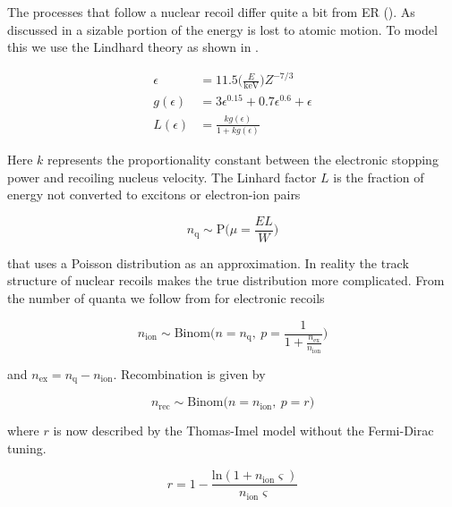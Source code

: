 The processes that follow a nuclear recoil differ quite a bit from ER ().  As
discussed in  a sizable portion of the energy is lost to atomic motion.  To model this we use the Lindhard theory
as shown in .

\begin{equation}
\begin{aligned}
\epsilon &= 11.5 \bigg( \frac{E}{\mathrm{keV}} \bigg) Z^{-7/3} \\
g( \epsilon ) &= 3 \epsilon ^{0.15} + 0.7 \epsilon ^{0.6} + \epsilon \\
L( \epsilon ) &= \frac{k g( \epsilon ) }{1 + k g( \epsilon )}
\label{eq:er_nr_calibrations_parameter_determ_nr_lindhard}
\end{aligned}
\end{equation}

Here $k$ represents the proportionality constant between the electronic stopping power and recoiling nucleus velocity.  The Linhard factor
$L$ is the fraction of energy not converted to excitons or electron-ion pairs

\begin{equation}
n_{\mathrm{q}} \sim \mathrm{P} \bigg( \mu = \frac{E L}{W} \bigg)
\end{equation}

\noindent that uses a Poisson distribution as an approximation.  In reality the track structure of nuclear recoils makes the true
distribution more complicated.  From the number of quanta we follow from  for
electronic recoils

\begin{equation}
n_{\mathrm{ion}} \sim \mathrm{Binom} \Bigg(n = n_{\mathrm{q}},\ p = \frac{1}{1 + \frac{n_{\mathrm{ex}}}{n_{\mathrm{ion}}}} \Bigg)
\end{equation}

\noindent and $n_{\mathrm{ex}} = n_{\mathrm{q}} - n_{\mathrm{ion}}$.  Recombination is given by

\begin{equation}
n_{\mathrm{rec}} \sim \mathrm{Binom} \big(n = n_{\mathrm{ion}},\ p = r \big)
\end{equation}

\noindent where $r$ is now described by the Thomas-Imel model without the Fermi-Dirac tuning.

\begin{equation}
r = 1 - \frac{\mathrm{ln} (1 + n_{\mathrm{ion}} \varsigma)}{n_{\mathrm{ion}} \varsigma}
\end{equation}

